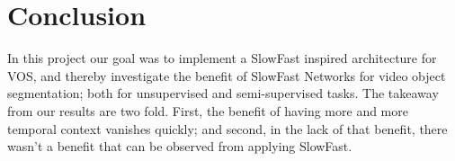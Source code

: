 \section{Conclusion}
In this project our goal was to implement a SlowFast inspired architecture for VOS, and thereby investigate the benefit of SlowFast Networks for video object segmentation; both for unsupervised and semi-supervised tasks. The takeaway from our results are two fold. First, the benefit of having more and more temporal context vanishes quickly; and second, in the lack of that benefit, there wasn't a benefit that can be observed from applying SlowFast. 